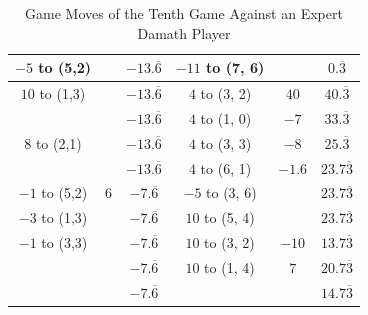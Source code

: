 \begin{appendices}
\begin{table}[H]
\begin{tabular}{cccccc}
          $-5$ to (5,2) &          &  $-13.\overline6$  & $-11$ to (7, 6) &              &  $0.\overline3$    \\ \hline
          $10$ to (1,3) &          &  $-13.\overline6$  & $4$ to (3, 2) & $40$            &  $40.\overline3$    \\ \hline
                        &          &  $-13.\overline6$  & $4$ to (1, 0) & $-7$             &  $33.\overline3$    \\ \hline
          $8$ to (2,1) &          &  $-13.\overline6$  & $4$ to (3, 3) & $-8$          &  $25.\overline3$    \\ \hline
                       &          &  $-13.\overline6$  & $4$ to (6, 1) & $-1.6$          &  $23.7\overline3$    \\ \hline
          $-1$ to (5,2) & $6$     &  $-7.\overline6$  & $-5$ to (3, 6) &               &  $23.7\overline3$    \\ \hline
          $-3$ to (1,3) &         &  $-7.\overline6$  & $10$ to (5, 4) &               &  $23.7\overline3$    \\ \hline
          $-1$ to (3,3) &         &  $-7.\overline6$  & $10$ to (3, 2) & $-10$           &  $13.7\overline3$    \\ \hline
                        &         &  $-7.\overline6$  & $10$ to (1, 4) & $7$              &  $20.7\overline3$    \\ \hline \hline
                        &         &  $-7.\overline6$  &                &                  &  $14.7\overline3$    \\ \hline
    \end{tabular}
    \caption{Game Moves of the Tenth Game Against an Expert Damath Player}
    \label{tab:tenth-game}
\end{table}
\end{appendices}
